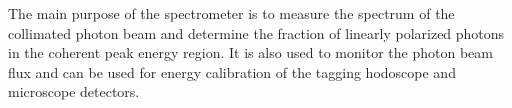 The main purpose of the spectrometer is to measure the spectrum of the
collimated photon beam and determine the fraction of linearly polarized
photons in the coherent peak energy region.
It is also used to monitor the photon beam flux and can be used for 
energy calibration of the tagging hodoscope and microscope detectors.



